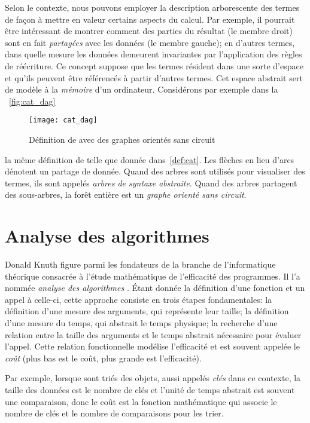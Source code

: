 Selon le contexte, nous pouvons employer la description arborescente
des termes de façon à mettre en valeur certains aspects du calcul. Par
exemple, il pourrait être intéressant de montrer comment des parties
du résultat (le membre droit) sont en fait
\emph{partagées} avec les données (le membre gauche);
en d'autres termes, dans quelle mesure les données demeurent
invariantes par l'application des règles de réécriture. Ce concept
suppose que les termes résident dans une sorte d'espace et qu'ils
peuvent être référencés à partir d'autres termes. Cet espace abstrait
sert de modèle à la \emph{mémoire} d'un
ordinateur. Considérons par exemple dans la \fig~\vref{fig:cat_dag}
\begin{figure}
\centering
\texttt{[image: cat\_dag]}
\caption{Définition de  avec des graphes orientés sans circuit}
\label{fig:cat_dag}
\end{figure}
la même définition de  telle que donnée
dans~\eqref{def:cat}. Les flèches en lieu d'arcs dénotent un partage
de donnée. Quand des arbres sont utilisés pour visualiser des termes,
ils sont appelés \emph{arbres de syntaxe abstraite}. Quand des arbres partagent des sous-arbres,
la forêt entière est un \emph{graphe orienté sans
circuit}. 

\section{Analyse des algorithmes}

Donald Knuth figure parmi les fondateurs de la branche de
l'informatique théorique consacrée à l'étude mathématique de
l'efficacité des programmes. Il l'a nommée \emph{analyse des
  algorithmes} \citep{SedgewickFlajolet_1996,Knuth_1997}. Étant donnée
la définition d'une fonction et un appel à celle-ci, cette approche
consiste en trois étapes fondamentales: la définition d'une mesure des
arguments, qui représente leur taille; la définition d'une mesure du
temps, qui abstrait le temps physique; la recherche d'une relation
entre la taille des arguments et le temps abstrait nécessaire pour
évaluer l'appel. Cette relation fonctionnelle modélise l'efficacité et
est souvent appelée le \emph{coût} (plus bas est le coût,
plus grande est l'efficacité).

Par exemple, lorsque sont triés des objets, aussi appelés
\emph{clés} dans ce contexte, la taille des
données est le nombre de clés et l'unité de temps abstrait est souvent
une comparaison, donc le coût est la fonction mathématique qui associe
le nombre de clés et le nombre de comparaisons pour les trier.

